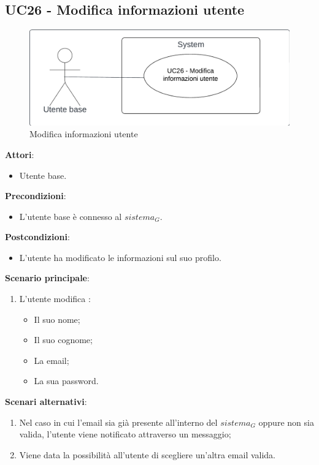 \subsection{UC26 - Modifica informazioni utente}\label{usecase:26}
\begin{figure}[H]
\centering
\includegraphics[width=0.75\linewidth]{ucd/UCD26}
\caption{Modifica informazioni utente}
\end{figure}
\textbf{Attori}:
\begin{itemize}
    \item Utente base.
\end{itemize}
\textbf{Precondizioni}:
\begin{itemize}
    \item L'utente base è connesso al $\textit{sistema}_G$.
\end{itemize}
\textbf{Postcondizioni}:
\begin{itemize}
    \item L'utente ha modificato le informazioni sul suo profilo.
\end{itemize}
\textbf{Scenario principale}:
\begin{enumerate}
    \item L'utente modifica :
    \begin{itemize}
        \item Il suo nome;
        \item Il suo cognome;
        \item La email;
        \item La sua password.
    \end{itemize}
\end{enumerate}
\textbf{Scenari alternativi}:
\begin{enumerate}
    \item Nel caso in cui l'email sia già presente all'interno del $\textit{sistema}_G$ oppure non sia valida, l'utente viene notificato attraverso un messaggio;
    \item Viene data la possibilità all'utente di scegliere un'altra email valida.
\end{enumerate}
\newpage
